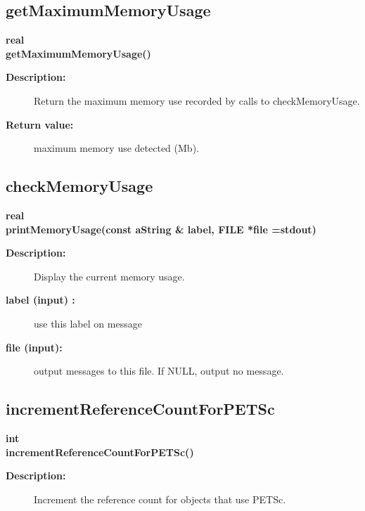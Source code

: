 \subsection{getMaximumMemoryUsage}
 
\begin{flushleft} \textbf{%
real  \\ 
\settowidth{\OvertureIncludeArgIndent}{getMaximumMemoryUsage(}%
getMaximumMemoryUsage()
}\end{flushleft}
\begin{description}
\item[{\bf Description:}] 
   Return the maximum memory use recorded by calls to checkMemoryUsage.
 
\item[{\bf Return value:}]  maximum memory use detected (Mb).
 
\end{description}
\subsection{checkMemoryUsage}
 
\begin{flushleft} \textbf{%
real  \\ 
\settowidth{\OvertureIncludeArgIndent}{printMemoryUsage(}%
printMemoryUsage(const aString \& label, FILE *file  =stdout)
}\end{flushleft}
\begin{description}
\item[{\bf Description:}] 
   Display the current memory usage.

\item[{\bf label (input) :}]  use this label on message
\item[{\bf file (input):}]  output messages to this file. If NULL, output no message.
 
\end{description}
\subsection{incrementReferenceCountForPETSc}
 
\begin{flushleft} \textbf{%
int  \\ 
\settowidth{\OvertureIncludeArgIndent}{incrementReferenceCountForPETSc(}%
incrementReferenceCountForPETSc()
}\end{flushleft}
\begin{description}
\item[{\bf Description:}] 
   Increment the reference count for objects that use PETSc.
\end{description}
